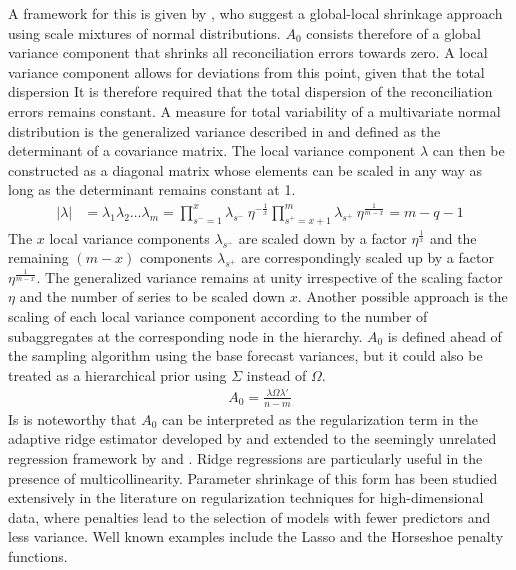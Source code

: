 \documentclass[a4paper,fleqn,11pt]{article}
\begin{document}
A framework for this is given by \cite{Polson2010}, who suggest a global-local shrinkage approach using scale mixtures of normal distributions. $A_0$ consists therefore of a global variance component that shrinks all reconciliation errors towards zero. A local variance component allows for deviations from this point, given that the total dispersion It is therefore required that the total dispersion of the reconciliation errors remains constant.  A measure for total variability of a multivariate normal distribution is the generalized variance described in \cite{Mustonen1997} and defined as the determinant of a covariance matrix. The local variance component $\lambda$ can then be constructed as a diagonal matrix whose elements can be scaled in any way as long as the determinant remains constant at 1.
\begin{align*}
|\lambda| &= \lambda_1 \lambda_2 \hdots \lambda_m
   	= \prod_{s^- = 1}^{x} \lambda_{s^-}\ \eta^{-\frac{1}{x}}   \prod_{s^+ = x+1}^{m} \lambda_{s^+}\ \eta^{\frac{1}{m-x}} = m-q-1
\end{align*}
The $x$ local variance components $\lambda_{s^-}$ are scaled down by a factor $\eta^{\frac{1}{x}}$ and the remaining $(m-x)$ components $\lambda_{s^+}$ are correspondingly scaled up by a factor $\eta^{\frac{1}{m-x}}$. The generalized variance remains at unity irrespective of the scaling factor $\eta$ and the number of series to be scaled down $x$. Another possible approach is the scaling of each local variance component according to the number of subaggregates at the corresponding node in the hierarchy. $A_0$ is defined ahead of the sampling algorithm using the base forecast variances, but it could also be treated as a hierarchical prior using $\Sigma$ instead of $\Omega$.
\begin{align}
    	A_0 =  \frac{\lambda\Omega \lambda'}{n-m}
\end{align}
Is is noteworthy that $A_0$ can be interpreted as the regularization term in the adaptive ridge estimator developed by \cite{Brown1980} and extended to the seemingly unrelated regression framework by \cite{Haitovsky1987} and \cite{Firinguetti1997}. Ridge regressions are particularly useful in the presence of multicollinearity. Parameter shrinkage of this form has been studied extensively in the literature on regularization techniques for high-dimensional data, where penalties lead to the selection of models with fewer predictors and less variance. Well known examples include the Lasso and the Horseshoe penalty functions.\\
\clearpage
\end{document}

